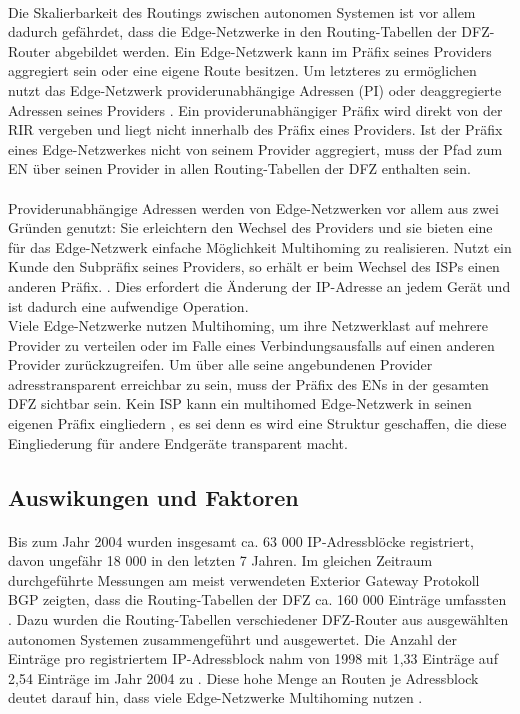 \paragraph{}
Die Skalierbarkeit des Routings zwischen autonomen Systemen ist vor allem dadurch gefährdet, dass die Edge-Netzwerke in den Routing-Tabellen der DFZ-Router abgebildet werden.
Ein Edge-Netzwerk kann im Präfix seines Providers aggregiert sein oder eine eigene Route besitzen. Um letzteres zu ermöglichen nutzt das Edge-Netzwerk  providerunabhängige Adressen (PI) oder deaggregierte Adressen seines Providers \cite{jen:2008:start}. Ein providerunabhängiger Präfix wird direkt von der RIR vergeben und liegt nicht innerhalb des Präfix eines Providers. Ist der Präfix eines Edge-Netzwerkes nicht von seinem Provider aggregiert, muss der Pfad zum EN über seinen Provider in allen Routing-Tabellen der DFZ enthalten sein.

\paragraph{}
Providerunabhängige Adressen werden von Edge-Netzwerken vor allem aus zwei Gründen genutzt: Sie erleichtern den Wechsel des Providers und sie bieten eine für das Edge-Netzwerk einfache Möglichkeit Multihoming zu realisieren. Nutzt ein Kunde den Subpräfix seines Providers, so erhält er beim Wechsel des ISPs einen anderen Präfix. \cite{jen:2008:start}. Dies erfordert die Änderung der IP-Adresse an jedem Gerät und ist dadurch eine aufwendige Operation. \\
Viele Edge-Netzwerke nutzen Multihoming, um ihre Netzwerklast auf mehrere Provider zu verteilen oder im Falle eines Verbindungsausfalls auf einen anderen Provider zurückzugreifen. Um über alle seine angebundenen Provider adresstransparent erreichbar zu sein, muss der Präfix des ENs in der gesamten DFZ sichtbar sein. Kein ISP kann ein multihomed Edge-Netzwerk in seinen eigenen Präfix eingliedern \cite{jen:2008:start}, es sei denn es wird eine Struktur geschaffen, die diese Eingliederung für andere Endgeräte transparent macht.

\subsection{Auswikungen und Faktoren}
\paragraph{}
Bis zum Jahr 2004 wurden insgesamt ca. 63 000 IP-Adressblöcke registriert, davon ungefähr 18 000 in den letzten 7 Jahren. Im gleichen Zeitraum durchgeführte Messungen am meist verwendeten Exterior Gateway Protokoll BGP zeigten, dass die Routing-Tabellen der DFZ ca. 160 000 Einträge umfassten \cite{journals/ccr/MengXZHLZ04}. Dazu wurden die Routing-Tabellen verschiedener DFZ-Router aus ausgewählten autonomen Systemen zusammengeführt und ausgewertet. Die Anzahl der Einträge pro registriertem IP-Adressblock nahm von 1998 mit 1,33 Einträge auf 2,54 Einträge im Jahr 2004 zu \cite{journals/ccr/MengXZHLZ04}. Diese hohe Menge an Routen je Adressblock deutet darauf hin, dass viele Edge-Netzwerke Multihoming nutzen \cite{huston:2001:analyzing}.

